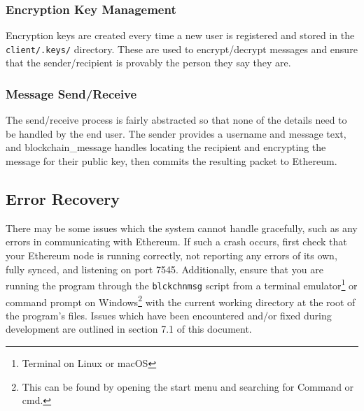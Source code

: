 \documentclass[titlepage]{report}
\begin{document}
\subsubsection{Encryption Key Management}
Encryption keys are created every time a new user is registered and stored in the \texttt{client/.keys/} directory. These are used to encrypt/decrypt messages and ensure that the sender/recipient is provably the person they say they are.
\subsubsection{Message Send/Receive}
The send/receive process is fairly abstracted so that none of the details need to be handled by the end user. The sender provides a username and message text, and blockchain\_message handles locating the recipient and encrypting the message for their \gls{public key}, then commits the resulting packet to \gls{Ethereum}.

\subsection{Error Recovery}
There may be some issues which the system cannot handle gracefully, such as any errors in communicating with \gls{Ethereum}. If such a crash occurs, first check that your \gls{Ethereum} \gls{node} is running correctly, not reporting any errors of its own, fully \gls{synced}, and listening on port 7545. Additionally, ensure that you are running the program through the \texttt{blckchnmsg} script from a terminal emulator\footnote{Terminal on Linux or macOS} or command prompt on Windows\footnote{This can be found by opening the start menu and searching for Command or cmd.} with the current working directory at the root of the program's files. Issues which have been encountered and/or fixed during development are outlined in section 7.1 of this document.
\end{document}
